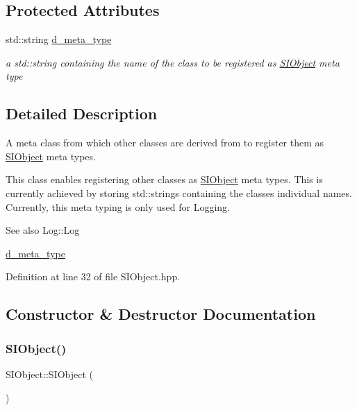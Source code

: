 \subsection*{Protected Attributes}
\begin{DoxyCompactItemize}
\item 
std\+::string \mbox{\hyperlink{class_s_i_object_ad7e84d405cf54a7d13a37bfaa61f5d98}{d\+\_\+meta\+\_\+type}}
\begin{DoxyCompactList}\small\item\em a std\+::string containing the name of the class to be registered as \mbox{\hyperlink{class_s_i_object}{S\+I\+Object}} meta type \end{DoxyCompactList}\end{DoxyCompactItemize}


\subsection{Detailed Description}
A meta class from which other classes are derived from to register them as \mbox{\hyperlink{class_s_i_object}{S\+I\+Object}} meta types. 

This class enables registering other classes as \mbox{\hyperlink{class_s_i_object}{S\+I\+Object}} meta types. This is currently achieved by storing std\+::strings containing the classes individual names. Currently, this meta typing is only used for Logging.

\begin{DoxySeeAlso}{See also}
Log\+::\+Log 

\mbox{\hyperlink{class_s_i_object_ad7e84d405cf54a7d13a37bfaa61f5d98}{d\+\_\+meta\+\_\+type}} 
\end{DoxySeeAlso}


Definition at line 32 of file S\+I\+Object.\+hpp.



\subsection{Constructor \& Destructor Documentation}
\mbox{\label{class_s_i_object_adf4ffbccc68e2c85a0f56774830e7a86}} 
\subsubsection{\texorpdfstring{SIObject()}{SIObject()}}
{\footnotesize\ttfamily S\+I\+Object\+::\+S\+I\+Object (\begin{DoxyParamCaption}{ }\end{DoxyParamCaption})\hspace{0.3cm}{\ttfamily [default]}}



